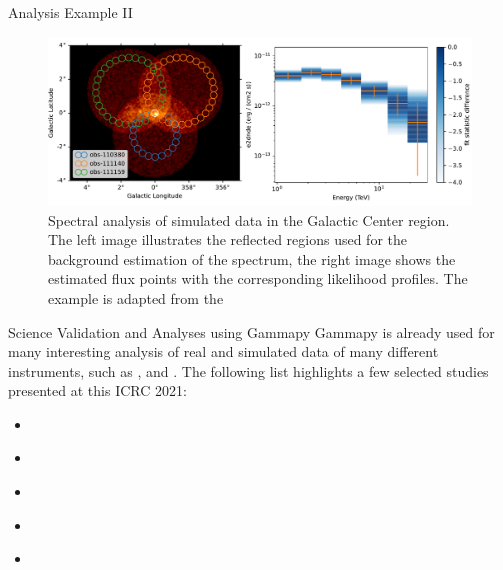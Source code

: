 \documentclass[
    final,
    ]{beamer}
\newlength{\colwidth}
\newcommand{\coloredhref}[3][blue]{\href{#2}{\color{#1}{#3}}}%
\begin{document}
\begin{frame}[t, fragile]
\begin{columns}[t]
\begin{column}{\colwidth}
\begin{block}{Analysis Example II}
    \begin{figure}
      \centering
      \includegraphics[width=\textwidth]{figures/cta-gc-image-spectrum.pdf}
      \caption{Spectral analysis of simulated \coloredhref[pink]{https://www.cta-observatory.org}{CTA} data in the Galactic Center region. The left image illustrates the reflected regions used for the  background estimation of the spectrum, the right image shows the estimated flux points with the
      corresponding likelihood profiles. The example is adapted from the \coloredhref[pink]{https://docs.gammapy.org/0.18.2/tutorials/cta_data_analysis.html}{cta data analysis tutorial} }
    \end{figure}
  \end{block}

  \begin{block}{Science Validation and Analyses using Gammapy}
  Gammapy is already used for many interesting analysis of real and simulated data of many different instruments, such as \coloredhref[pink]{https://www.mpi-hd.mpg.de/hfm/HESS/}{HESS}, \coloredhref[pink]{https://www.hawc-observatory.org}{HAWC} and \coloredhref[pink]{https://www.cta-observatory.org}{CTA}. The following list highlights a few selected studies presented at this ICRC 2021:

  \begin{itemize}
    \item \coloredhref[pink]{https://indico.desy.de/event/27991/contributions/101917/}{Survey of the Galactic Plane with the Cherenkov Telescope Array}
    \item \coloredhref[pink]{https://indico.desy.de/event/27991/contributions/101942/}{Discovery of 100 TeV gamma-rays from HESS J1702-420: a new PeVatron candidate}
    \item \coloredhref[pink]{https://indico.desy.de/event/27991/contributions/101938/}{Search for enhanced TeV gamma ray emission from Giant Molecular Clouds using H.E.S.S.}
    \item \coloredhref[pink]{https://indico.desy.de/event/27991/contributions/101937/}{The young massive stellar cluster Westerlund 1 in gamma rays as seen with H.E.S.S.}
    \item \coloredhref[pink]{https://indico.desy.de/event/27991/contributions/102013/}{Standardized formats for gamma-ray analysis applied to HAWC observatory data}
  \end{itemize}


\end{block}
\end{column}
\end{columns}
\end{frame}
\end{document}
